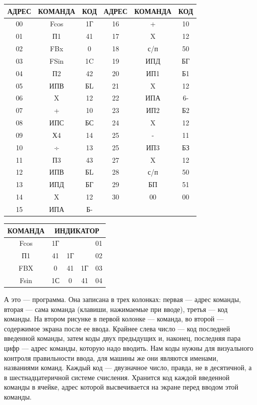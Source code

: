 \documentclass[11pt,a4paper,oneside]{article}
\begin{document}
\begin{tabular}{|c|c|c|c|c|c|}\hline
АДРЕС & КОМАНДА & КОД & АДРЕС & КОМАНДА & КОД \\\hline
00 & Fcos & 1Г & 16 & + & 10 \\\hline
01 & П1 & 41 & 17 & X & 12 \\\hline
02 & FBx & 0 & 18 & с/п & 50 \\\hline
03 & FSin & 1C & 19 & ИПД & БГ \\\hline
04 & П2 & 42 & 20 & ИП1 & Б1 \\\hline
05 & ИПВ & БL & 21 & X & 12 \\\hline
06 & X & 12 & 22 & ИПА & 6- \\\hline
07 & + & 10 & 23 & ИП2 & Б2 \\\hline
08 & ИПС & БС & 24 & X & 12 \\\hline
09 & Х4 & 14 & 25 & - & 11 \\\hline
10 & ÷ & 13 & 25 & ИП3 & БЗ \\\hline
11 & П3 & 43 & 27 & X & 12 \\\hline
12 & ИПВ & БL & 28 & с/п & 50 \\\hline
13 & ИПД & БГ & 29 & БП & 51 \\\hline
14 & X & 12 & 30 & 00 & 00 \\\hline
15 & ИПА & Б- & & & \\\hline
\end{tabular}

\begin{tabular}{|c|c|c|c|c|}\hline
КОМАНДА & \multicolumn{4}{|c|}{ИНДИКАТОР} \\\hline
Fcos & 1Г & & & 01 \\
П1 & 41 & 1Г & & 02 \\
FBX & 0 & 41 & 1Г & 03 \\
Fsin & 1С & 0 & 41 & 04 \\\hline
\end{tabular}

А это — программа. Она записана в трех колонках: первая — адрес команды, вторая — сама команда (клавиши, нажимаемые при вводе), третья — код команды. На втором рисунке в первой колонке — команда, во второй — содержимое экрана после ее ввода. Крайнее слева число — код последней введенной команды, затем коды двух предыдущих и, наконец, последняя пара цифр — адрес команды, которую надо вводить. Нам коды нужны для визуального контроля правильности ввода, для машины же они являются именами, названиями команд. Каждый код — двузначное число, правда, не в десятичной, а в шестнадцатеричной системе счисления. Хранится код каждой введенной команды в ячейке, адрес которой высвечивается на экране перед вводом этой команды.
\end{document}

